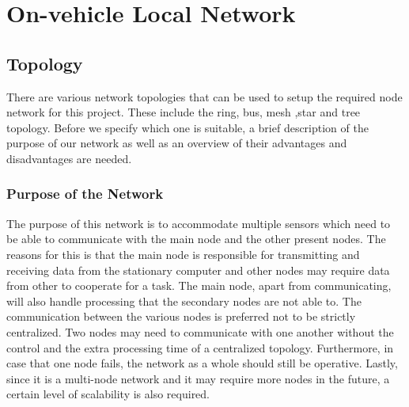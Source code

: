 
\section{On-vehicle Local Network}

\subsection{Topology}

There are various network topologies that can be used to setup the required node network for this project. These include the ring, bus, mesh ,star and tree topology. Before we specify which one is suitable, a brief description of the purpose of our network as well as an overview of their advantages and disadvantages are needed. 

\subsubsection{Purpose of the Network}
The purpose of this network is to accommodate multiple sensors which need to be able to communicate with the main node and the other present nodes. The reasons for this is that the main node is responsible for transmitting and receiving data from the stationary computer and other nodes may require data from other to cooperate for a task. The main node, apart from communicating, will also handle processing that the secondary nodes are not able to. The communication between the various nodes is preferred not to be strictly centralized. Two nodes may need to communicate with one another without the control and the extra processing time of a centralized topology. Furthermore, in case that one node fails, the network as a whole should still be operative. Lastly, since it is a multi-node network and it may require more nodes in the future, a certain level of scalability is also required.

